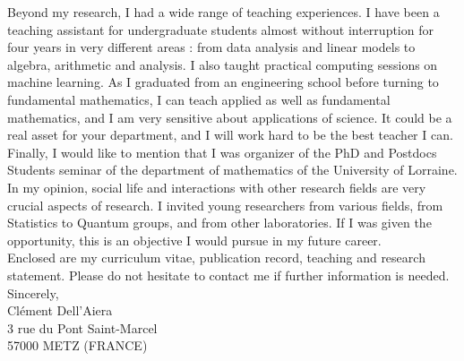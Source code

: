 \documentclass[a4paper]{article}
\begin{document}
Beyond my research, I had a wide range of teaching experiences. I have been a teaching assistant for undergraduate students almost without interruption for four years in very different areas : from data analysis and linear models to algebra, arithmetic and analysis. I also taught practical computing sessions on machine learning. As I graduated from an engineering school before turning to fundamental mathematics, I can teach applied as well as fundamental mathematics, and I am very sensitive about applications of science. It could be a real asset for your department, and I will work hard to be the best teacher I can. \\

Finally, I would like to mention that I was organizer of the PhD and Postdocs Students seminar of the department of mathematics of the University of Lorraine. In my opinion, social life and interactions with other research fields are very crucial aspects of research. I invited young researchers from various fields, from Statistics to Quantum groups, and from other laboratories. If I was given the opportunity, this is an objective I would pursue in my future career. \\

Enclosed are my curriculum vitae, publication record, teaching and research statement. Please do not hesitate to contact me if further information is needed. \\

Sincerely,\\

Clément Dell’Aiera\\
3 rue du Pont Saint-Marcel\\
57000 METZ (FRANCE)\\

\newpage

 
\end{document}
